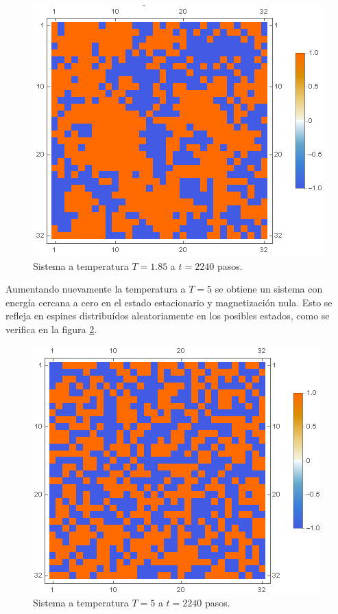 \documentclass[aps,prb,twocolumn,superscriptaddress,floatfix,longbibliography]{revtex4-2}
\begin{document}
\begin{figure}[h]
    \includegraphics[clip=true,width=\columnwidth]{final_T_1.85.png}
    \caption{Sistema a temperatura $T = 1.85$ a $t = 2240$ pasos.}
     \label{fig:final_T_1.85}
\end{figure}

Aumentando nuevamente la temperatura a $T = 5$ se obtiene un sistema con energía cercana a cero en el estado estacionario y magnetización nula. Esto se refleja en espines distribuídos aleatoriamente en los posibles estados, como se verifica en la figura \ref{fig:final_T_5}.

\begin{figure}[h]
    \includegraphics[clip=true,width=\columnwidth]{final_T_5.png}
    \caption{Sistema a temperatura $T = 5$ a $t = 2240$ pasos.}
     \label{fig:final_T_5}
\end{figure}
\end{document}
